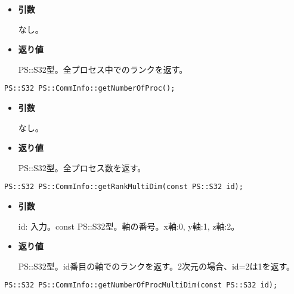 \begin{itemize}

\item{{\bf 引数}}

なし。

\item{{\bf 返り値}}

{PS::S32}型。全プロセス中でのランクを返す。

\end{itemize}


\begin{screen}
\begin{verbatim}
PS::S32 PS::CommInfo::getNumberOfProc();
\end{verbatim}
\end{screen}

\begin{itemize}

\item{{\bf 引数}}

なし。

\item{{\bf 返り値}}

PS::S32型。全プロセス数を返す。

\end{itemize}


\begin{screen}
\begin{verbatim}
PS::S32 PS::CommInfo::getRankMultiDim(const PS::S32 id);
\end{verbatim}
\end{screen}

\begin{itemize}

\item{{\bf 引数}}

id: 入力。const PS::S32型。軸の番号。x軸:0, y軸:1, z軸:2。

\item{{\bf 返り値}}

PS::S32型。id番目の軸でのランクを返す。2次元の場合、id=2は1を返す。

\end{itemize}


\begin{screen}
\begin{verbatim}
PS::S32 PS::CommInfo::getNumberOfProcMultiDim(const PS::S32 id);
\end{verbatim}
\end{screen}

